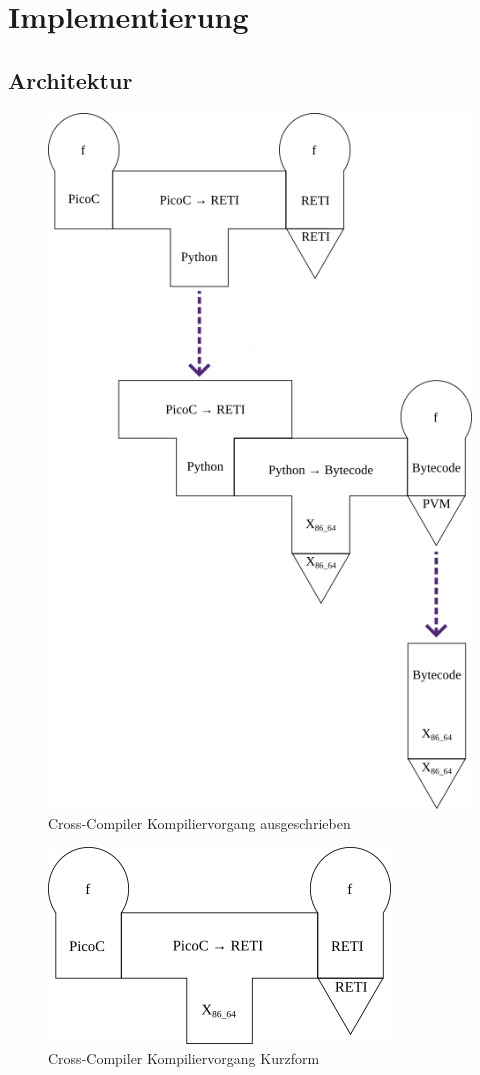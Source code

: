 
\chapter{Implementierung}
\label{ch:implementierung}
\section{Architektur}

\begin{figure}[H]
  \centering
  \includegraphics[width=0.5\linewidth]{./figures/summarized_cross_compiler.png}
  \caption{Cross-Compiler Kompiliervorgang ausgeschrieben}
\end{figure}

\begin{figure}[H]
  \centering
  \includegraphics[width=0.33\linewidth]{./figures/compiliervorang_mit_machiene.png}
  \caption{Cross-Compiler Kompiliervorgang Kurzform}
\end{figure}

